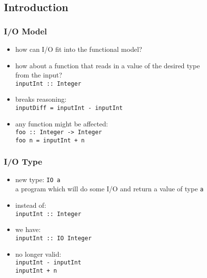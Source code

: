 \documentclass[dvipsnames]{beamer}
\theoremstyle{plain}
\begin{document}
\subsection{Introduction}

\begin{frame}
  \frametitle{I/O Model}

  \begin{itemize}
    \item how can I/O fit into the functional model?

    \bigskip
    \item how about a function that reads in a value of the desired type\\
      from the input?\\
      \smallskip
      \lstinline{inputInt :: Integer}

    \pause
    \medskip
    \item breaks reasoning:\\
      \smallskip
      \lstinline{inputDiff = inputInt - inputInt}

    \medskip
    \item any function might be affected:\\
      \smallskip
      \lstinline{foo :: Integer -> Integer}\\
      \lstinline{foo n = inputInt + n}\\
  \end{itemize}
\end{frame}

\begin{frame}
  \frametitle{I/O Type}

  \begin{itemize}
    \item new type: \lstinline{IO a}\\
      a program which will do some I/O and return a value of type \texttt{a}

    \medskip
    \item instead of:\\
      \smallskip
      \lstinline{inputInt :: Integer}
    \item we have:\\
      \smallskip
      \lstinline{inputInt :: IO Integer}

    \pause
    \medskip
    \item no longer valid:\\
      \texttt{inputInt - inputInt}\\
      \texttt{inputInt + n}
  \end{itemize}
\end{frame}
\end{document}
